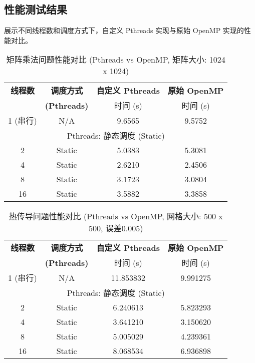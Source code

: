\documentclass{SYSUReport}
\begin{document}
\subsection{性能测试结果}
展示不同线程数和调度方式下，自定义 Pthreads 实现与原始 OpenMP 实现的性能对比。
\begin{table}[h!]
\centering
\caption{矩阵乘法问题性能对比 (Pthreads vs OpenMP, 矩阵大小: 1024 x 1024)}
\begin{tabular}{|c|c|c|c|}
\hline
\textbf{线程数} & \textbf{调度方式} & \textbf{自定义 Pthreads} & \textbf{原始 OpenMP} \\
\cline{3-4} %
 & \textbf{(Pthreads)} & 时间 (s) & 时间 (s) \\
\hline
1 (串行) & N/A & 9.6565 & 9.5752 \\
\hline
\multicolumn{4}{|c|}{Pthreads: 静态调度 (Static)} \\
\hline
2 & Static & 5.0383 & 5.3081 \\
4 & Static & 2.6210 & 2.4506 \\
8 & Static & 3.1723 & 3.0804 \\
16 & Static & 3.5882 & 3.3858 \\
\hline
\end{tabular}
\label{tab:performance_comparison_time_onl1y}
\end{table}
\begin{table}[h!]
\centering
\caption{热传导问题性能对比 (Pthreads vs OpenMP, 网格大小: 500 x 500, 误差0.005)}
\begin{tabular}{|c|c|c|c|}
\hline
\textbf{线程数} & \textbf{调度方式} & \textbf{自定义 Pthreads} & \textbf{原始 OpenMP} \\
\cline{3-4} %
 & \textbf{(Pthreads)} & 时间 (s) & 时间 (s) \\
\hline
1 (串行) & N/A & 11.853832 & 9.991275 \\
\hline
\multicolumn{4}{|c|}{Pthreads: 静态调度 (Static)} \\
\hline
2 & Static & 6.240613 & 5.823293 \\
4 & Static & 3.641210 & 3.150620 \\
8 & Static & 5.005029 & 4.239361 \\
16 & Static & 8.068534 & 6.936898 \\
\hline
\end{tabular}
\label{tab:performance_comparison_time_only}
\end{table}
\end{document}
